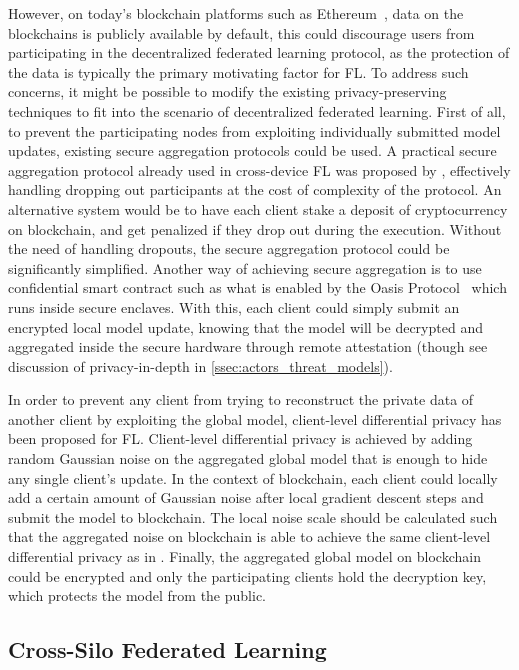 \documentclass[11pt]{article}
\begin{document}
However, on today’s blockchain platforms such as Ethereum~\citep{wood2014ethereum}, data on the blockchains is publicly available by default, this could discourage users from participating in the decentralized federated learning protocol, as the protection of the data is typically the primary motivating factor for FL. To address such concerns, it might be possible to modify the existing privacy-preserving techniques to fit into the scenario of decentralized federated learning. First of all, to prevent the participating nodes from exploiting individually submitted model updates, existing secure aggregation protocols could be used. A practical secure aggregation protocol already used in cross-device FL was proposed by \citet{bonawitz17secagg}, effectively handling dropping out participants at the cost of complexity of the protocol. An alternative system would be to have each client stake a deposit of cryptocurrency on blockchain, and get penalized if they drop out during the execution. Without the need of handling dropouts, the secure aggregation protocol could be significantly simplified. Another way of achieving secure aggregation is to use confidential smart contract such as what is enabled by the Oasis Protocol~\citep{cheng2019ekiden} which runs inside secure enclaves. With this, each client could simply submit an encrypted local model update, knowing that the model will be decrypted and aggregated inside the secure hardware through remote attestation (though see discussion of privacy-in-depth in \cref{ssec:actors_threat_models}).

In order to prevent any client from trying to reconstruct the private data of another client by exploiting the global model, client-level differential privacy \citep{mcmahan18dplm} has been proposed for FL.  Client-level differential privacy is achieved by adding random Gaussian noise on the aggregated global model that is enough to hide any single client's update. In the context of blockchain, each client could locally add a certain amount of Gaussian noise after local gradient descent steps and submit the model to blockchain. The local noise scale should be calculated such that the aggregated noise on blockchain is able to achieve the same client-level differential privacy as in \citep{mcmahan18dplm}. Finally, the aggregated global model on blockchain could be encrypted and only the participating clients hold the decryption key, which protects the model from the public.

\subsection{Cross-Silo Federated Learning}
\label{ssec:cross-silo}
\end{document}
